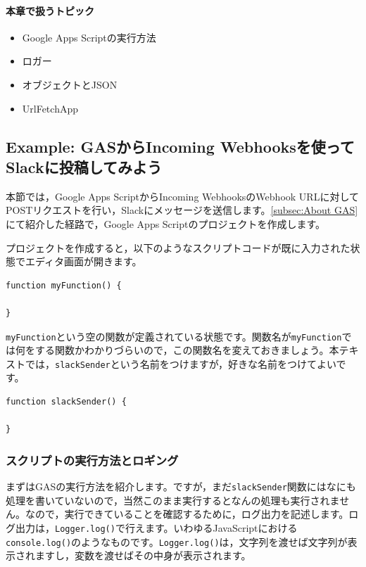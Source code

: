\documentclass[uplatex,a4j]{jsarticle}
\begin{document}
\paragraph{本章で扱うトピック}
\begin{itemize}
\item Google Apps Scriptの実行方法
\item ロガー
\item オブジェクトとJSON
\item UrlFetchApp
\end{itemize}

\subsection{Example: GASからIncoming Webhooksを使ってSlackに投稿してみよう}

本節では，Google Apps ScriptからIncoming WebhooksのWebhook URLに対してPOSTリクエストを行い，Slackにメッセージを送信します。\ref{subsec:About GAS}にて紹介した経路で，Google Apps Scriptのプロジェクトを作成します。

プロジェクトを作成すると，以下のようなスクリプトコードが既に入力された状態でエディタ画面が開きます。

\begin{lstlisting}[basicstyle=\ttfamily\footnotesize,frame=single,caption=Default Script]
function myFunction() {

}
\end{lstlisting}

\verb|myFunction|という空の関数が定義されている状態です。関数名が\verb|myFunction|では何をする関数かわかりづらいので，この関数名を変えておきましょう。本テキストでは，\verb|slackSender|という名前をつけますが，好きな名前をつけてよいです。

\begin{lstlisting}[basicstyle=\ttfamily\footnotesize,frame=single,caption=Change function name]
function slackSender() {

}
\end{lstlisting}

\subsubsection{スクリプトの実行方法とロギング}

まずはGASの実行方法を紹介します。ですが，まだ\verb|slackSender|関数にはなにも処理を書いていないので，当然このまま実行するとなんの処理も実行されません。なので，実行できていることを確認するために，ログ出力を記述します。ログ出力は，\verb|Logger.log()|で行えます。いわゆるJavaScriptにおける\verb|console.log()|のようなものです。\verb|Logger.log()|は，文字列を渡せば文字列が表示されますし，変数を渡せばその中身が表示されます。
\end{document}
